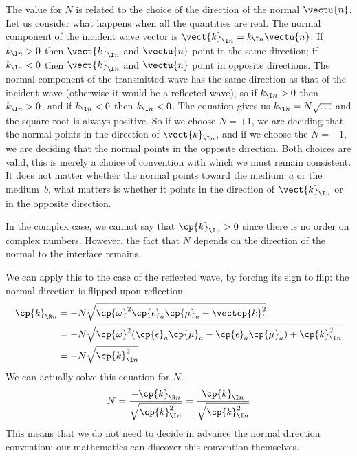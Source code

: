 \begin{refsection}
The value for $N$ is related to the choice of the direction of the normal $\vectu{n}$.
Let us consider what happens when all the quantities are real.
The normal component of the incident wave vector is $\vect{k}_{\I n}=k_{\I n}\vectu{n}$.
If $k_{\I n}>0$ then $\vect{k}_{\I n}$ and $\vectu{n}$ point in the same direction;
if $k_{\I n}<0$ then $\vect{k}_{\I n}$ and $\vectu{n}$ point in opposite directions.
The normal component of the transmitted wave has the same direction as that of the incident wave (otherwise it would be a reflected wave),
so if $k_{\T n}>0$ then $k_{\I n}>0$, and if $k_{\T n}<0$ then $k_{\I n}<0$.
The equation gives us $k_{\T n} = N\sqrt{\ldots}$ and the square root is always positive.
So if we choose $N=+1$, we are deciding that the normal points in the direction of $\vect{k}_{\I n}$, and if we choose the $N=-1$, we are deciding that the normal points in the opposite direction.
Both choices are valid, this is merely a choice of convention with which we must remain consistent.
It does not matter whether the normal points toward the medium~$a$ or the medium~$b$, what matters is whether it points in the direction of $\vect{k}_{\I n}$ or in the opposite direction.

In the complex case, we cannot say that $\cp{k}_{\I n}>0$ since there is no order on complex numbers.
However, the fact that $N$ depends on the direction of the normal to the interface remains.

We can apply this to the case of the reflected wave, by forcing its sign to flip: the normal direction is flipped upon reflection.
\begin{subequations}
\begin{align}
    \cp{k}_{\R n}
    &= -N \sqrt{\cp{\omega}^2 \cp{\epsilon}_a \cp{\mu}_a - \vectcp{k}_t^2}
    \\
    &= -N \sqrt{\cp{\omega}^2 (\cp{\epsilon}_a \cp{\mu}_a - \cp{\epsilon}_a \cp{\mu}_a) + \cp{k}_{\I n}^2}
    \\
    &= -N \sqrt{\cp{k}_{\I n}^2}
\end{align}
\end{subequations}
We can actually solve this equation for $N$.
\begin{equation}
    N =
    \frac{-\cp{k}_{\R n}}{\sqrt{\cp{k}_{\I n}^2}} =
    \frac{ \cp{k}_{\I n}}{\sqrt{\cp{k}_{\I n}^2}}
\end{equation}
This means that we do not need to decide in advance the normal direction convention: our mathematics can discover this convention themselves.


\end{refsection}
